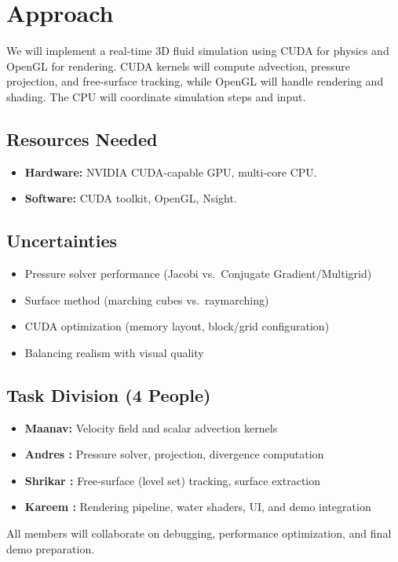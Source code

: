 \section{Approach}
\label{sec:approach}

We will implement a real-time 3D fluid simulation using CUDA for physics and OpenGL for rendering. 
CUDA kernels will compute advection, pressure projection, and free-surface tracking, while OpenGL will handle rendering and shading. 
The CPU will coordinate simulation steps and input.

\subsection{Resources Needed} 
\begin{itemize}
    \item \textbf{Hardware:} NVIDIA CUDA-capable GPU, multi-core CPU.
    \item \textbf{Software:} CUDA toolkit, OpenGL, Nsight.
\end{itemize}

\subsection{Uncertainties}
\begin{itemize}
    \item Pressure solver performance (Jacobi vs.\ Conjugate Gradient/Multigrid)
    \item Surface method (marching cubes vs.\ raymarching)
    \item CUDA optimization (memory layout, block/grid configuration)
    \item Balancing realism with visual quality
\end{itemize}

\subsection{Task Division (4 People)}
\begin{itemize}
    \item \textbf{Maanav:} Velocity field and scalar advection kernels
    \item \textbf{Andres :} Pressure solver, projection, divergence computation
    \item \textbf{Shrikar :} Free-surface (level set) tracking, surface extraction
    \item \textbf{Kareem :} Rendering pipeline, water shaders, UI, and demo integration
\end{itemize}
All members will collaborate on debugging, performance optimization, and final demo preparation.
